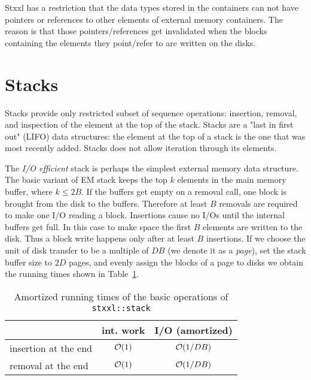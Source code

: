\documentclass[twoside]{book}
\newcommand{\stxxl}{{\sc Stxxl} }
\begin{document}
\stxxl has a restriction that the data types stored in the containers
can not have pointers or references to other elements of external memory
containers. The reason is that those pointers/references get
invalidated when the blocks containing the elements they point/refer to are
written on the disks.





\newcommand{\xstack}{\texttt{stxxl::stack}}

\section{Stacks}
\label{stacksection}
Stacks provide only restricted subset of
sequence operations: insertion, removal, and inspection of the element
at the top of the stack. Stacks are a "last in first out" (LIFO) data
structures: the element at the top of a stack is the one that was most
recently added. Stacks does not allow iteration through its
elements. 

The \emph{I/O efficient} stack is perhaps the simplest external memory
data structure. The basic variant of EM stack keeps the top $k$
elements in the main memory buffer, where $k \leq 2B$. If the buffers
get empty on a removal call, one block is brought from the disk to the
buffers. Therefore at least $B$ removals are required to make one I/O
reading a block. Insertions cause no I/Os until the internal buffers
get full. In this case to make space the first $B$ elements are
written to the disk. Thus a block write happens only after at least
$B$ insertions. If we choose the unit of disk
transfer to be a multiple of $DB$ (we denote it as a \emph{page}), set the
stack buffer size to $2D$ pages, and evenly assign the blocks of a
page to disks we obtain the running times shown in
Table~\ref{rtstack}. 

\begin{table}[h]
\begin{center}
\caption{Amortized running times of the basic operations of \xstack}
\label{rtstack}
\begin{tabular}{|l|c|c|}
\hline
                    & int. work & I/O (amortized)\\
\hline\hline
insertion at the end& $\mathcal{O}\!\left( 1\right)$ & $\mathcal{O}\!\left( 1/DB\right)$\\
\hline
removal at the end  & $\mathcal{O}\!\left( 1\right)$ & $\mathcal{O}\!\left( 1/DB\right)$ \\
\hline
\end{tabular}
\end{center}
\end{table}
\end{document}
